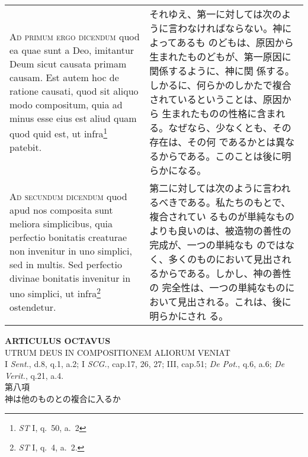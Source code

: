 \documentclass[10pt]{jsarticle} %
\begin{document}
\begin{longtable}{p{21em}p{21em}}
\\


{\scshape Ad primum ergo dicendum} quod ea quae sunt a Deo, imitantur Deum sicut
 causata primam causam. Est autem hoc de ratione causati, quod sit
 aliquo modo compositum, quia ad minus esse eius est aliud quam quod
 quid est, ut infra\footnote{{\itshape ST} I, q.~50, a.~2} patebit.

&

それゆえ、第一に対しては次のように言わなければならない。神によってあるも
 のどもは、原因から生まれたものどもが、第一原因に関係するように、神に関
 係する。しかるに、何らかのしかたで複合されているということは、原因から
 生まれたものの性格に含まれる。なぜなら、少なくとも、その存在は、その何
 であるかとは異なるからである。このことは後に明らかになる。

\\

{\scshape Ad secundum dicendum} quod apud nos composita sunt meliora
 simplicibus, quia perfectio bonitatis creaturae non invenitur in uno
 simplici, sed in multis. Sed perfectio divinae bonitatis invenitur in
 uno simplici, ut infra\footnote{{\itshape ST} I, q.~4, a.~2.} ostendetur.

&

第二に対しては次のように言われるべきである。私たちのもとで、複合されてい
 るものが単純なものよりも良いのは、被造物の善性の完成が、一つの単純なも
 のではなく、多くのものにおいて見出されるからである。しかし、神の善性の
 完全性は、一つの単純なものにおいて見出される。これは、後に明らかにされ
 る。

\end{longtable}

\newpage
{}
\begin{center}
 {\Large {\bf ARTICULUS OCTAVUS}}\\
 {\large UTRUM DEUS IN COMPOSITIONEM ALIORUM VENIAT}\\
 {\footnotesize I {\itshape Sent.}, d.8, q.1, a.2; I {\itshape SCG.},
 cap.17, 26, 27; III, cap.51; {\itshape De Pot.}, q.6, a.6; {\itshape De
 Verit.}, q.21, a.4.}\\
 {\Large 第八項\\神は他のものとの複合に入るか}
\end{center}
\end{document}
